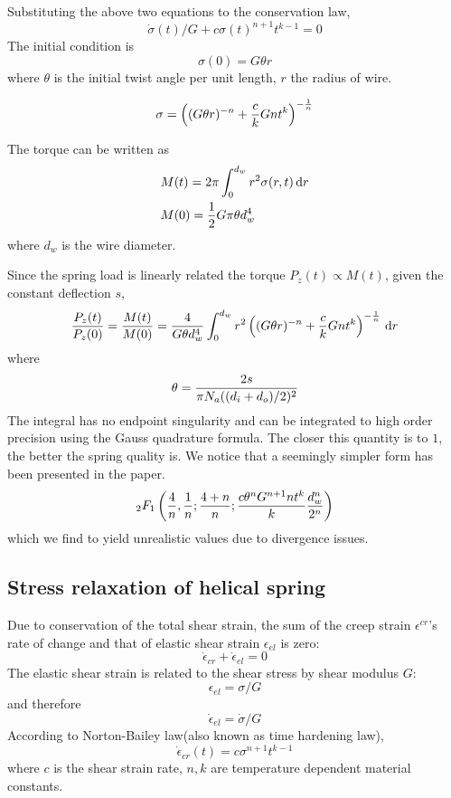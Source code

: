 \documentclass[10pt]{article}
\begin{document}
Substituting the above two equations to the conservation law,
\begin{equation} \label{eq:diff}
\dot{\sigma}(t)/G+c\sigma(t)^{n+1} t^{k-1}=0
\end{equation}
The initial condition is
\[
\sigma (0) = G\theta r
\]
where $\theta$ is the initial twist angle per unit length, $r$ the radius of wire.

\[
\sigma = \left( (G\theta r)^{-n} + {c\over k} Gnt^k \right)^{-{1\over n}}
\]

The torque can be written as
\begin{align*}
&M(t) = 2\pi \int_0^{d_w} r^2 \sigma(r,t)\,\mathrm{d} r\\
&M(0)={1\over 2} G\pi\theta d_w^4
\end{align*}
where $d_w$ is the wire diameter.

Since the spring load is linearly related the torque $P_z(t)\propto M(t)$, given the constant deflection $s$,
\[
{P_z(t)\over P_z(0)} = {M(t)\over M(0)} = {4\over G\theta d_w^4}\int_0^{d_w} r^2 \left( (G\theta r)^{-n} + {c\over k} Gnt^k \right)^{-{1\over n}} \,\mathrm{d} r
\]
where
\[
\theta = {2s\over \pi N_a ((d_i+d_o)/2)^2}
\]
The integral has no endpoint singularity and can be integrated to high order precision using the Gauss quadrature formula. The closer this quantity is to $1$, the better the spring quality is. We notice that a seemingly simpler form has been presented in the paper.
\[
{}_{2}F_1 \left( {4\over n},{1\over n};{4+n\over n};{c\theta^n G^{n+1} n t^k\over k} {d_w^n\over 2^n}\right)
\]
which we find to yield unrealistic values due to divergence issues.

\subsection{Stress relaxation of helical spring}
\label{sec:Relaxation}

Due to conservation of the total shear strain, the sum of the creep strain $\epsilon^{cr}$'s rate of change and that of elastic shear strain $\epsilon_{el}$ is zero:
\[
\dot{\epsilon}_{cr} + \dot{\epsilon}_{el} = 0
\]
The elastic shear strain is related to the shear stress by shear modulus $G$:
\[
\epsilon_{el} = \sigma/G
\]
and therefore
\[
\dot{\epsilon}_{el} = \dot{\sigma}/G
\]
According to Norton-Bailey law(also known as time hardening law),
\begin{equation} \label{eq:N-B}
\dot{\epsilon}_{cr}(t)=c\sigma^{n+1} t^{k-1}
\end{equation}
where $c$ is the shear strain rate, $n,k$ are temperature dependent material constants.
\end{document}
